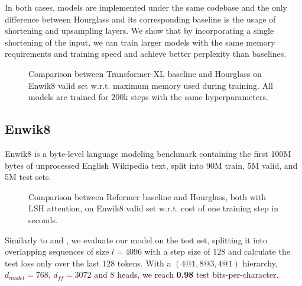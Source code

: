 \documentclass[11pt]{article}
\begin{document}
In both cases, models are implemented under the same codebase and the only difference between Hourglass and its corresponding baseline is the usage of shortening and upsampling layers. We show that by incorporating a single shortening of the input, we can train larger models with the same memory requirements and training speed and achieve better perplexity than baselines.

\begin{figure}[ht!]
\centering
\centering
\caption{
Comparison between Transformer-XL baseline and Hourglass on Enwik8 valid set w.r.t. maximum memory used during training. All models are trained for 200k steps with the same hyperparameters. 
}
\label{fig:enwik}
\end{figure}

\setlength{\textfloatsep}{0.5em}
\subsection{Enwik8}\label{sec:enwik}
Enwik8 \cite{enwik} is a byte-level language modeling benchmark containing the first 100M bytes of unprocessed English Wikipedia text, split into 90M train, 5M valid, and 5M test sets.

\begin{figure}
\centering
\centering
\caption{
Comparison between Reformer baseline and Hourglass, both with LSH attention, on Enwik8 valid set w.r.t. cost of one training step in seconds.
}
\label{fig:reformer}
\end{figure}

Similarly to \cite{dai2019transformerxl} and \cite{beltagy2020longformer}, we evaluate our model on the test set, splitting it into overlapping sequences of size $l = 4096$ with a step size of $128$ and calculate the test loss only over the last $128$ tokens. With a $(4@1, 8@3, 4@1)$ hierarchy, $d_{model}=768$, $d_{ff}=3072$ and $8$ heads, we reach \textbf{0.98} test bits-per-character.
\end{document}

